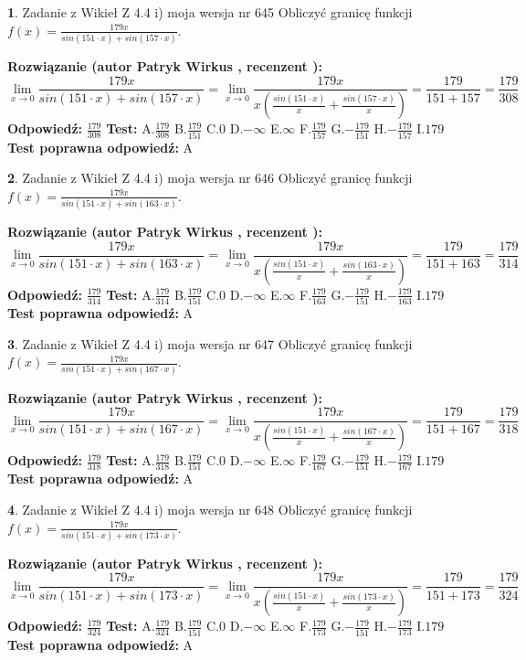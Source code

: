 \documentclass[12pt, a4paper]{article}
\theoremstyle{definition} %
\newtheorem{zad}{}
\newcommand{\zadStart}[1]{\begin{zad}#1\newline}
\newcommand{\zadStop}{\end{zad}}
\newcommand{\rozwStart}[2]{\noindent \textbf{Rozwiązanie (autor #1 , recenzent #2): }\newline}
\newcommand{\rozwStop}{\newline}
\newcommand{\odpStart}{\noindent \textbf{Odpowiedź:}\newline}
\newcommand{\odpStop}{\newline}
\newcommand{\testStart}{\noindent \textbf{Test:}\newline}
\newcommand{\testStop}{\newline}
\newcommand{\kluczStart}{\noindent \textbf{Test poprawna odpowiedź:}\newline}
\newcommand{\kluczStop}{\newline}
\begin{document}
\zadStart{Zadanie z Wikieł Z 4.4 i) moja wersja nr 645}
Obliczyć granicę funkcji $f(x)=\frac{179x}{sin(151\cdot x) +sin(157\cdot x)}$.
\zadStop
\rozwStart{Patryk Wirkus}{}
$$\lim\limits_{x\to 0}\frac{179x}{sin(151\cdot x) +sin(157\cdot x)}=\lim\limits_{x\to 0}\frac{179x}{x(\frac{sin(151\cdot x)}{x}+\frac{sin(157\cdot x)}{x})}=\frac{179}{151+157} = \frac{179}{308}$$
\rozwStop
\odpStart
$\frac{179}{308}$
\odpStop
\testStart
A.$\frac{179}{308}$
B.$\frac{179}{151}$
C.$0$
D.$-\infty$
E.$\infty$
F.$\frac{179}{157}$
G.$-\frac{179}{151}$
H.$-\frac{179}{157}$
I.$179$
\testStop
\kluczStart
A
\kluczStop



\zadStart{Zadanie z Wikieł Z 4.4 i) moja wersja nr 646}
Obliczyć granicę funkcji $f(x)=\frac{179x}{sin(151\cdot x) +sin(163\cdot x)}$.
\zadStop
\rozwStart{Patryk Wirkus}{}
$$\lim\limits_{x\to 0}\frac{179x}{sin(151\cdot x) +sin(163\cdot x)}=\lim\limits_{x\to 0}\frac{179x}{x(\frac{sin(151\cdot x)}{x}+\frac{sin(163\cdot x)}{x})}=\frac{179}{151+163} = \frac{179}{314}$$
\rozwStop
\odpStart
$\frac{179}{314}$
\odpStop
\testStart
A.$\frac{179}{314}$
B.$\frac{179}{151}$
C.$0$
D.$-\infty$
E.$\infty$
F.$\frac{179}{163}$
G.$-\frac{179}{151}$
H.$-\frac{179}{163}$
I.$179$
\testStop
\kluczStart
A
\kluczStop



\zadStart{Zadanie z Wikieł Z 4.4 i) moja wersja nr 647}
Obliczyć granicę funkcji $f(x)=\frac{179x}{sin(151\cdot x) +sin(167\cdot x)}$.
\zadStop
\rozwStart{Patryk Wirkus}{}
$$\lim\limits_{x\to 0}\frac{179x}{sin(151\cdot x) +sin(167\cdot x)}=\lim\limits_{x\to 0}\frac{179x}{x(\frac{sin(151\cdot x)}{x}+\frac{sin(167\cdot x)}{x})}=\frac{179}{151+167} = \frac{179}{318}$$
\rozwStop
\odpStart
$\frac{179}{318}$
\odpStop
\testStart
A.$\frac{179}{318}$
B.$\frac{179}{151}$
C.$0$
D.$-\infty$
E.$\infty$
F.$\frac{179}{167}$
G.$-\frac{179}{151}$
H.$-\frac{179}{167}$
I.$179$
\testStop
\kluczStart
A
\kluczStop



\zadStart{Zadanie z Wikieł Z 4.4 i) moja wersja nr 648}
Obliczyć granicę funkcji $f(x)=\frac{179x}{sin(151\cdot x) +sin(173\cdot x)}$.
\zadStop
\rozwStart{Patryk Wirkus}{}
$$\lim\limits_{x\to 0}\frac{179x}{sin(151\cdot x) +sin(173\cdot x)}=\lim\limits_{x\to 0}\frac{179x}{x(\frac{sin(151\cdot x)}{x}+\frac{sin(173\cdot x)}{x})}=\frac{179}{151+173} = \frac{179}{324}$$
\rozwStop
\odpStart
$\frac{179}{324}$
\odpStop
\testStart
A.$\frac{179}{324}$
B.$\frac{179}{151}$
C.$0$
D.$-\infty$
E.$\infty$
F.$\frac{179}{173}$
G.$-\frac{179}{151}$
H.$-\frac{179}{173}$
I.$179$
\testStop
\kluczStart
A
\kluczStop
\end{document}
